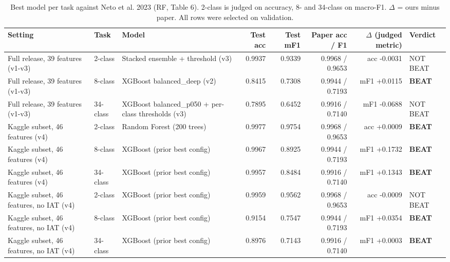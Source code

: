 \begin{table}[!t]
\centering
\caption{Best model per task against Neto et al. 2023 (RF, Table 6). 2-class is judged on accuracy, 8- and 34-class on macro-F1. $\Delta$ = ours minus paper. All rows were selected on validation.}\label{tab:best}
\scriptsize
\setlength{\tabcolsep}{3pt}
\begin{tabular}{p{3.4cm}lp{3.6cm}rrrrl}
\toprule
\textbf{Setting} & \textbf{Task} & \textbf{Model} & \textbf{Test acc} & \textbf{Test mF1} & \textbf{Paper acc / F1} & \textbf{$\Delta$ (judged metric)} & \textbf{Verdict} \\
\midrule
Full release, 39 features (v1-v3) & 2-class & Stacked ensemble + threshold (v3) & 0.9937 & 0.9339 & 0.9968 / 0.9653 & acc -0.0031 & NOT BEAT \\
Full release, 39 features (v1-v3) & 8-class & XGBoost balanced\_deep (v2) & 0.8415 & 0.7308 & 0.9944 / 0.7193 & mF1 +0.0115 & \textbf{BEAT} \\
Full release, 39 features (v1-v3) & 34-class & XGBoost balanced\_p050 + per-class thresholds (v3) & 0.7895 & 0.6452 & 0.9916 / 0.7140 & mF1 -0.0688 & NOT BEAT \\
Kaggle subset, 46 features (v4) & 2-class & Random Forest (200 trees) & 0.9977 & 0.9754 & 0.9968 / 0.9653 & acc +0.0009 & \textbf{BEAT} \\
Kaggle subset, 46 features (v4) & 8-class & XGBoost (prior best config) & 0.9967 & 0.8925 & 0.9944 / 0.7193 & mF1 +0.1732 & \textbf{BEAT} \\
Kaggle subset, 46 features (v4) & 34-class & XGBoost (prior best config) & 0.9957 & 0.8484 & 0.9916 / 0.7140 & mF1 +0.1343 & \textbf{BEAT} \\
Kaggle subset, 46 features, no IAT (v4) & 2-class & XGBoost (prior best config) & 0.9959 & 0.9562 & 0.9968 / 0.9653 & acc -0.0009 & NOT BEAT \\
Kaggle subset, 46 features, no IAT (v4) & 8-class & XGBoost (prior best config) & 0.9154 & 0.7547 & 0.9944 / 0.7193 & mF1 +0.0354 & \textbf{BEAT} \\
Kaggle subset, 46 features, no IAT (v4) & 34-class & XGBoost (prior best config) & 0.8976 & 0.7143 & 0.9916 / 0.7140 & mF1 +0.0003 & \textbf{BEAT} \\
\bottomrule
\end{tabular}
\end{table}
